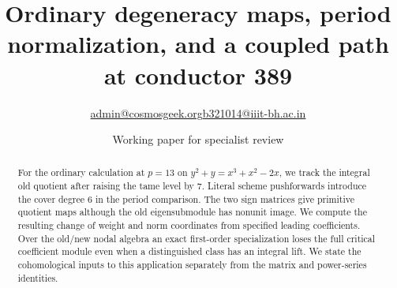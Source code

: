 \documentclass[11pt]{article}
\title{Ordinary degeneracy maps, period normalization, and a coupled path at conductor 389}
\author{\small\href{mailto:admin@cosmosgeek.org}{admin@cosmosgeek.org}\qquad\href{mailto:b321014@iiit-bh.ac.in}{b321014@iiit-bh.ac.in}}
\date{Working paper for specialist review}
\begin{document}
\maketitle
\begin{abstract}
For the ordinary calculation at $p=13$ on $y^2+y=x^3+x^2-2x$,
we track the integral old quotient after raising the tame level by $7$.
Literal scheme pushforwards introduce the cover degree $6$ in the
period comparison. The two sign matrices give primitive quotient maps
although the old eigensubmodule has nonunit image. We compute the
resulting change of weight and norm coordinates from specified
leading coefficients. Over the old/new nodal algebra an exact
first-order specialization loses the full critical coefficient module
even when a distinguished class has an integral lift. We state the
cohomological inputs to this application separately from the matrix
and power-series identities.
\end{abstract}
\end{document}
